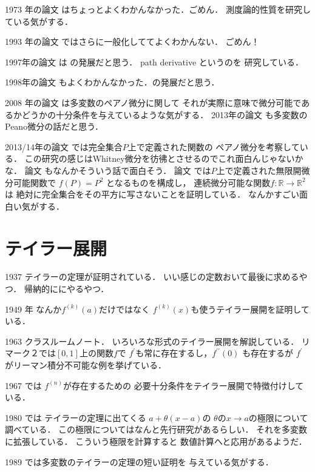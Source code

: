 \documentclass[leqno, a4paper, 12pt]{jsarticle}
\newcommand{\rr}{\mathbb{R}}
\begin{document}
1973 年の論文
\cite{MR0311845}
はちょっとよくわかんなかった．ごめん．
測度論的性質を研究している気がする．

1993 年の論文
\cite{MR1234991}
ではさらに一般化しててよくわかんない．
ごめん！

1997年の論文
\cite{MR1396976}
は
\cite{MR1234991}の発展だと思う．
path derivative というのを
研究している．

1998年の論文
\cite{MR1605380}
もよくわかんなかった．\cite{MR1234991}の発展だと思う．

2008 年の論文
\cite{MR2373608}
は多変数のペアノ微分に関して
それが実際に意味で微分可能であるかどうかの十分条件を与えているような気がする．
2013年の論文
\cite{MR3043022}
も多変数のPeano微分の話だと思う．

2013/14年の論文
\cite{MR3261899}
では完全集合$P$上で定義された関数の
ペアノ微分を考察している．
この研究の感じはWhitney微分を彷彿とさせるのでこれ面白んじゃないかな．
論文
\cite{MR3658803}もなんかそういう話で面白そう．
論文\cite{MR3261899}
では$P$上で定義された無限開微分可能関数で
$f(P)=P^{2}$
となるものを構成し，
連続微分可能な関数$f\colon \rr\to \rr^{2}$は
絶対に完全集合をその平方に写さないことを証明している．
なんかすごい面白い気がする．

\section{テイラー展開}


1937 
\cite{MR1523823}
テイラーの定理が証明されている．
いい感じの定数おいて最後に求めるやつ．
帰納的ににやるやつ．

1949
年
\cite{MR0028907}
なんか$f^{(k)}(a)$だけではなく
$f^{(k)}(x)$も使うテイラー展開を証明している．

1963
\cite{MR1532320}
クラスルームノート．
いろいろな形式のテイラー展開を解説している．
リマーク２では$[0, 1]$上の関数$f$で
$f^{\prime}$も常に存在するし，$f^{\prime\prime}(0)$
も存在するが
$f^{\prime}$がリーマン積分不可能な例を挙げている．



1967
\cite{MR1534508}
では
$f^{(n)}$が存在するための
必要十分条件をテイラー展開で特徴付けしている．

1980
\cite{MR0567920}
では
テイラーの定理に出てくる
$a+\theta(x-a)$の
$\theta$の$x\to a$の極限について調べている．
この極限についてはなんと先行研究があるらしい．
それを多変数に拡張している．
こういう極限を計算すると
数値計算へと応用があるようだ．

1989
\cite{MR1541471}
では多変数のテイラーの定理の短い証明を
与えている気がする．
\end{document}
